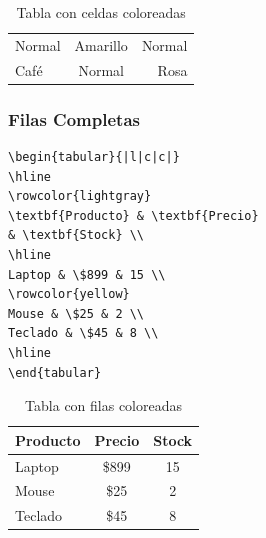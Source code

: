\begin{table}[h]
\centering
\begin{tabular}{|l|c|r|}
\hline
Normal & \cellcolor{yellow}Amarillo & Normal \\
\cellcolor{brown}Café & Normal & \cellcolor{pink}Rosa \\
\hline
\end{tabular}
\caption{Tabla con celdas coloreadas}
\end{table}

\subsubsection{Filas Completas}
\begin{verbatim}
\begin{tabular}{|l|c|c|}
\hline
\rowcolor{lightgray}
\textbf{Producto} & \textbf{Precio}
& \textbf{Stock} \\
\hline
Laptop & \$899 & 15 \\
\rowcolor{yellow}
Mouse & \$25 & 2 \\
Teclado & \$45 & 8 \\
\hline
\end{tabular}
\end{verbatim}

\begin{table}[h]
\centering
\begin{tabular}{|l|c|c|}
\hline
\rowcolor{lightgray}
\textbf{Producto} & \textbf{Precio} & \textbf{Stock} \\
\hline
Laptop & \$899 & 15 \\
\rowcolor{yellow}
Mouse & \$25 & 2 \\
Teclado & \$45 & 8 \\
\hline
\end{tabular}
\caption{Tabla con filas coloreadas}
\end{table}
